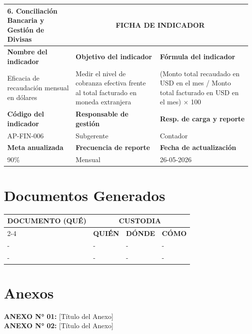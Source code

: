 \documentclass[11pt,letterpaper]{report}
\newcommand{\fichaIndicador}[9]{
  \noindent
  \begin{tabularx}{\textwidth}{p{0.25\textwidth}XX}
  \toprule
  \textbf{#1} & \multicolumn{2}{c}{\textbf{FICHA DE INDICADOR}} \\
  \midrule
  \textbf{Nombre del indicador} & \textbf{Objetivo del indicador} & \textbf{Fórmula del indicador} \\
  #2 & #3 & #4 \\
  \midrule
  \textbf{Código del indicador} & \textbf{Responsable de gestión} & \textbf{Resp. de carga y reporte} \\
  #5 & #6 & #7 \\
  \midrule
  \textbf{Meta anualizada} & \textbf{Frecuencia de reporte} & \textbf{Fecha de actualización} \\
  #8 & #9 & 26-05-2026 \\
  \bottomrule
  \end{tabularx}
  \vspace{1.5em}
}
\begin{document}
\fichaIndicador{6. Conciliación Bancaria y Gestión de Divisas}{Eficacia de recaudación mensual en dólares}{Medir el nivel de cobranza efectiva frente al total facturado en moneda extranjera}{(Monto total recaudado en USD en el mes / Monto total facturado en USD en el mes) $\times$ 100}{AP-FIN-006}{Subgerente}{Contador}{90\%}{Mensual}

\newpage

\chapter{Documentos Generados}

\begin{tabularx}{\textwidth}{XXXX}
\toprule
\multirow{2}{*}{\textbf{DOCUMENTO (QUÉ)}} & \multicolumn{3}{c}{\textbf{CUSTODIA}} \\
\cmidrule{2-4}
& \textbf{QUIÉN} & \textbf{DÓNDE} & \textbf{CÓMO} \\
\midrule
- & - & - & - \\
- & - & - & - \\
\bottomrule
\end{tabularx}

\vspace{3em}

\chapter{Anexos}
\textbf{ANEXO N° 01:} [Título del Anexo] \\
\textbf{ANEXO N° 02:} [Título del Anexo]
\end{document}
